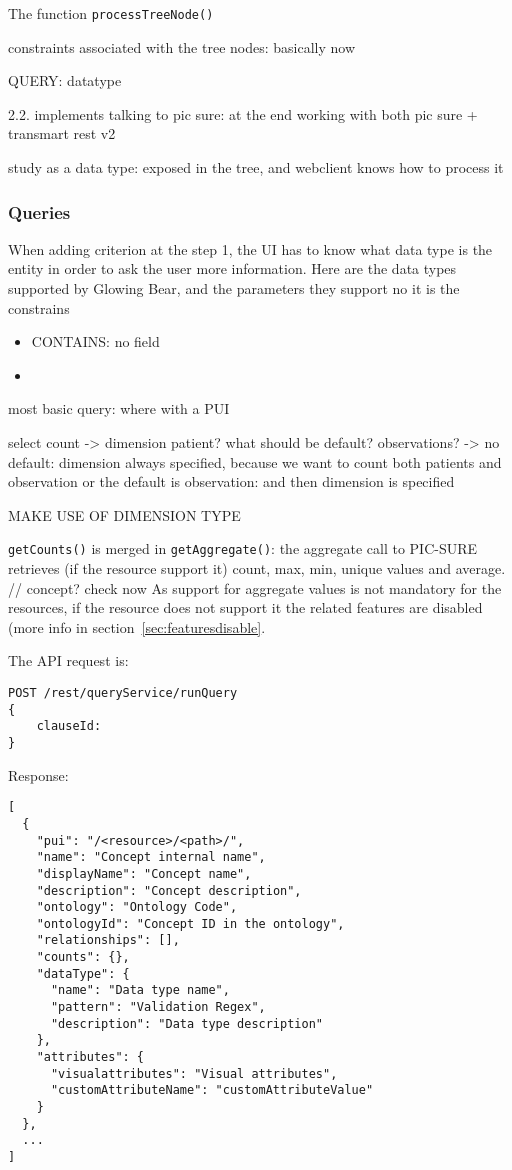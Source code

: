The function \verb|processTreeNode()|

constraints associated with the tree nodes: basically now 



QUERY: datatype


2.2. implements talking to pic sure: at the end working with both pic sure + transmart rest v2 

study as a data type: exposed in the tree, and webclient knows how to process it 

\subsubsection{Queries}

When adding criterion at the step 1, the UI has to know what data type is the entity in order to ask the user more information. Here are the data types supported by Glowing Bear, and the parameters they support no it is the constrains
\begin{itemize}
    \item CONTAINS: no field
    \item 
\end{itemize}


most basic query: where with a PUI

select count 
-> dimension patient? what should be default? observations? 
-> no default: dimension always specified, because we want to count both patients and observation 
or the default is observation: and then dimension is specified 

MAKE USE OF DIMENSION TYPE

\verb|getCounts()| is merged in \verb|getAggregate()|: the aggregate call to PIC-SURE retrieves (if the resource support it) count, max, min, unique values and average. // concept? check now
As support for aggregate values is not mandatory for the resources, if the resource does not support it the related features are disabled (more info in section~\ref{sec:featuresdisable}.


The API request is:
\begin{verbatim}
POST /rest/queryService/runQuery
{
    clauseId: 
}
\end{verbatim}

Response:
\begin{verbatim}
[
  {
    "pui": "/<resource>/<path>/",
    "name": "Concept internal name",
    "displayName": "Concept name",
    "description": "Concept description",
    "ontology": "Ontology Code",
    "ontologyId": "Concept ID in the ontology",
    "relationships": [],
    "counts": {},
    "dataType": {
      "name": "Data type name",
      "pattern": "Validation Regex",
      "description": "Data type description"
    },
    "attributes": {
      "visualattributes": "Visual attributes",
      "customAttributeName": "customAttributeValue"
    }
  },
  ...
]
\end{verbatim}


